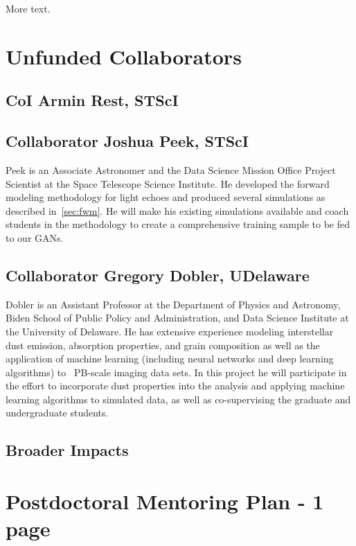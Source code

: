 \documentclass{proposalnsf}
\begin{document}
More text.
\section{Unfunded Collaborators}

\subsection{CoI Armin Rest, STScI}




\subsection{Collaborator Joshua Peek, STScI}
Peek is an Associate Astronomer and the Data Science Mission Office Project Scientist at the Space Telescope Science Institute. He developed the forward modeling methodology for light echoes and produced several simulations as described in~\autoref{sec:fwm}. He will make his existing simulations available and coach students in the methodology to create a comprehensive training sample to be fed to our GANs. 

\subsection{Collaborator Gregory Dobler, UDelaware}
Dobler is an Assistant Professor at the Department of Physics and Astronomy, Biden School of Public Policy and Administration, and Data Science Institute at the University of Delaware.  He has extensive experience modeling interstellar dust emission, absorption properties, and grain composition as well as the application of machine learning (including neural networks and deep learning algorithms) to ~PB-scale imaging data sets.  In this project he will participate in the effort to incorporate dust properties into the analysis and applying machine learning algorithms to simulated data, as well as co-supervising the graduate and undergraduate students.

\subsection{Broader Impacts}


\clearpage
{}
\clearpage
\section{Postdoctoral Mentoring Plan - 1 page}



\clearpage


\newpage
{}
\renewcommand{\thepage} {E--\arabic{page}}




\newpage
{}
\renewcommand{\thepage} {G--\arabic{page}}
\end{document}
